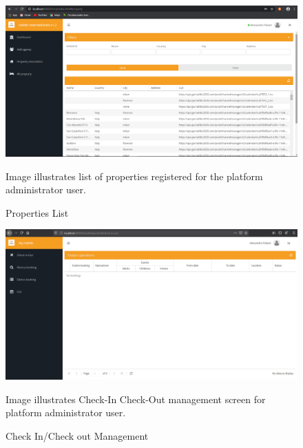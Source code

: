 \begin{figure} 
\centering
\includegraphics[width=12cm]{pictures/screens/properties-platform-admin.png}
\caption{Properties List}
Image illustrates list of properties registered for the platform administrator user.
\label{fig:properties_platform_admin_pic}
\end{figure}

\begin{figure} 
\centering
\includegraphics[width=12cm]{pictures/screens/checkin-out-platform-admin.png}
\caption{Check In/Check out Management}
Image illustrates Check-In Check-Out management screen for platform administrator user.
\label{fig:checkin_checkout_platform_admin_pic}
\end{figure}